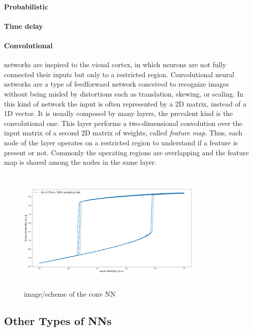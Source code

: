 \paragraph{Probabilistic}

\paragraph{Time delay}

\paragraph{Convolutional}\label{par:Convolutional} networks are inspired to the visual cortex, in which neurons are not fully connected their inputs but only to a restricted region.
Convolutional neural networks are a type of feedforward network conceived to recognize images without being misled by distortions such as translation, skewing, or scaling.
In this kind of network the input is often represented by a 2D matrix, instead of a 1D vector.
It is usually composed by many layers, the prevalent kind is the convolutional one.
This layer performs a two-dimensional convolution over the input matrix of a second 2D matrix of weights, called \textit{feature map}.
Thus, each node of the layer operates on a restricted region to understand if a feature is present or not.
Commonly the operating regions are overlapping and the feature map is shared among the nodes in the same layer.

\begin{figure}[ht]
	\centering
	\includegraphics[draft,width=9cm,height=6cm]{figures/foo.png}
	\caption{image/scheme of the conv NN}
	\label{fig:convolutionalNN}
\end{figure}


\subsection{Other Types of NNs}
\label{ssec:Other_Types_of_NNs}
